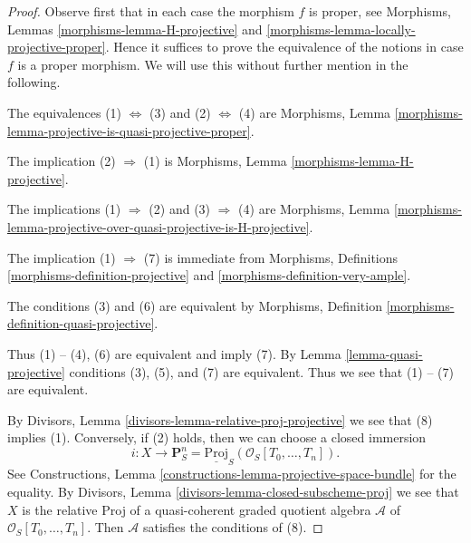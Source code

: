 \documentclass[10pt,a4paper]{amsart}
\theoremstyle{plain}
\theoremstyle{definition}
\theoremstyle{remark}
\numberwithin{equation}{subsection}
\begin{document}
\begin{proof}
Observe first that in each case the morphism $f$ is proper, see
Morphisms, Lemmas \ref{morphisms-lemma-H-projective} and
\ref{morphisms-lemma-locally-projective-proper}.
Hence it suffices to prove the equivalence of the notions in
case $f$ is a proper morphism. We will use this without further
mention in the following.

\medskip\noindent
The equivalences (1) $\Leftrightarrow$ (3) and
(2) $\Leftrightarrow$ (4) are
Morphisms, Lemma \ref{morphisms-lemma-projective-is-quasi-projective-proper}.

\medskip\noindent
The implication (2) $\Rightarrow$ (1) is
Morphisms, Lemma \ref{morphisms-lemma-H-projective}.

\medskip\noindent
The implications (1) $\Rightarrow$ (2) and (3) $\Rightarrow$ (4) are
Morphisms, Lemma
\ref{morphisms-lemma-projective-over-quasi-projective-is-H-projective}.

\medskip\noindent
The implication (1) $\Rightarrow$ (7) is immediate from
Morphisms, Definitions \ref{morphisms-definition-projective} and
\ref{morphisms-definition-very-ample}.

\medskip\noindent
The conditions (3) and (6) are equivalent by
Morphisms, Definition \ref{morphisms-definition-quasi-projective}.

\medskip\noindent
Thus (1) -- (4), (6) are equivalent and imply (7). By
Lemma \ref{lemma-quasi-projective}
conditions (3), (5), and (7) are equivalent.
Thus we see that (1) -- (7) are equivalent.

\medskip\noindent
By Divisors, Lemma \ref{divisors-lemma-relative-proj-projective}
we see that (8) implies (1). Conversely, if (2) holds, then
we can choose a closed immersion
$$
i :
X
\longrightarrow
\mathbf{P}^n_S = \underline{\text{Proj}}_S(\mathcal{O}_S[T_0, \ldots, T_n]).
$$
See Constructions, Lemma \ref{constructions-lemma-projective-space-bundle}
for the equality. By
Divisors, Lemma \ref{divisors-lemma-closed-subscheme-proj}
we see that $X$ is the relative Proj of a quasi-coherent graded quotient
algebra $\mathcal{A}$ of $\mathcal{O}_S[T_0, \ldots, T_n]$.
Then $\mathcal{A}$ satisfies the conditions of (8).
\end{proof}
\end{document}
